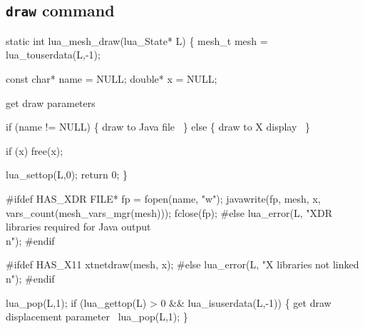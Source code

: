 \nwendcode{}\nwdocspar

\subsection{{\tt{}draw} command}

\nwenddocs{}\plusendmoddef
static int lua_mesh_draw(lua_State* L)
\{
    mesh_t mesh = lua_touserdata(L,-1);

    const char* name = NULL;
    double*     x    = NULL;

    \LA{}get draw parameters~{\nwtagstyle{}}\RA{}

    if (name != NULL) \{
        \LA{}draw to Java file~{\nwtagstyle{}}\RA{}
    \} else \{
        \LA{}draw to X display~{\nwtagstyle{}}\RA{}
    \}

    if (x)
        free(x);

    lua_settop(L,0);
    return 0;
\}

\nwendcode{}\nwdocspar

\nwenddocs{}\endmoddef
#ifdef HAS_XDR
    FILE* fp = fopen(name, "w");
    javawrite(fp, mesh, x, vars_count(mesh_vars_mgr(mesh)));
    fclose(fp);
#else
    lua_error(L, "XDR libraries required for Java output\\n");
#endif
\nwendcode{}\nwdocspar

\nwenddocs{}\endmoddef
#ifdef HAS_X11
    xtnetdraw(mesh, x);
#else
    lua_error(L, "X libraries not linked\\n");
#endif
\nwendcode{}\nwdocspar

\nwenddocs{}\endmoddef
lua_pop(L,1);
if (lua_gettop(L) > 0 && lua_isuserdata(L,-1)) \{
    \LA{}get draw displacement parameter~{\nwtagstyle{}}\RA{}
    lua_pop(L,1);
\}

